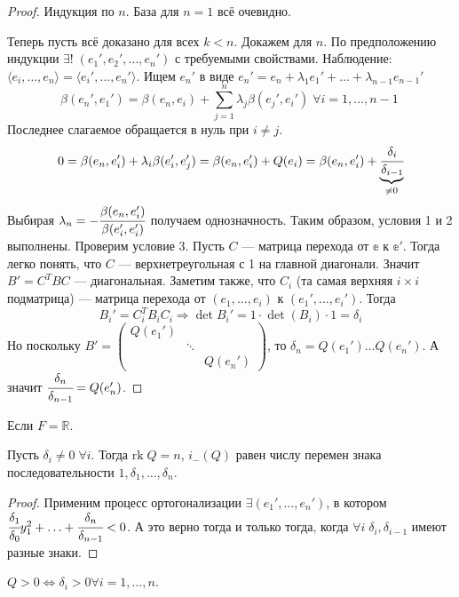 \begin{proof}
	Индукция по $n$. База для $n = 1$ всё очевидно. 
	\par Теперь пусть всё доказано для всех $k<n$. Докажем для $n$. По предположению индукции $\exists !\; (e_1', e_2', \ldots, e_n')$ с требуемыми свойствами. Наблюдение: $\langle e_i, \ldots, e_n\rangle = \langle e_i', \ldots, e_n'\rangle$. Ищем $e_n'$ в виде $e_n' = e_n + \lambda_1 e_1' + \ldots + \lambda_{n-1}e_{n-1}'$
	\[
 \beta(e_n', e_1') = \beta(e_n, e_i) + \sum\limits^{n}_{j = 1} \lambda_j\beta (e_j', e_i')	\;\forall i=1,\ldots, n-1\
	\]
	Последнее слагаемое обращается в нуль при $i \neq j$.
	\[
		0 = \beta(e_n, e_i') + \lambda_i \beta(e_i', e_j')= \beta(e_n, e_i') + Q(e_i) = \beta(e_n, e_i') + \underbrace{\cfrac{\delta_i}{\delta_{i - 1}}}_{\neq 0}
	\]
	Выбирая $\lambda_n = -\cfrac{\beta(e_n, e_i')}{\beta(e_i', e_i')}$ получаем однозначность. Таким образом, условия 1 и 2 выполнены. Проверим условие 3. Пусть $C$ --- матрица перехода от $\mathbb{e}$ к $\mathbb{e}'$. Тогда легко понять, что $C$ --- верхнетреугольная с 1 на главной диагонали. Значит $B' = C^{T}BC$ --- диагональная. Заметим также, что $C_i$ (та самая верхняя $i\times i$ подматрица) --- матрица перехода от $(e_1, \ldots, e_i)$ к $(e_1', \ldots, e_i')$. Тогда
	\[
		B_i' = C_i^TB_iC_i \Rightarrow \det B_i' = 1\cdot \det(B_i) \cdot 1 = \delta_i
	\]
	Но поскольку $B' = \begin{pmatrix}
		Q(e_1')& \ & \ \\
		 \ & \ddots& \  \\
		 \ &\ & Q(e_n')
	\end{pmatrix}$, то $\delta_n = Q(e_1')\ldots Q(e_n')$. А значит $\cfrac{\delta_n}{\delta_{n-1}} = Q(e_n')$.
\end{proof}
Если $F = \mathbb{R}$.
\begin{Theorem}[Якоби]
	Пусть $\delta_i \neq 0\; \forall i$. Тогда $\mathrm{rk}\; Q = n$, $i_{-}(Q)$ равен числу перемен знака последовательности $1, \delta_1, \ldots, \delta_n$.
\end{Theorem}
\begin{proof}
	Применим процесс ортогонализации $\exists (e_1', \ldots, e_n')$, в котором $\cfrac{\delta_1}{\delta_0}y_1^2 +\ldots + \cfrac{\delta_n}{\delta_{n-1}} < 0$. А это верно тогда и только тогда, когда $\forall i\; \delta_i, \delta_{i-1}$ имеют разные знаки.
\end{proof}
\begin{Theorem}
	$Q > 0 \Leftrightarrow \delta_i > 0 \forall i = 1,\ldots, n$.
\end{Theorem}
